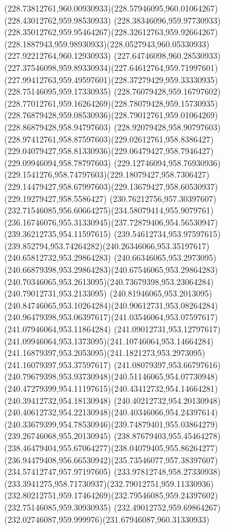 {{		\curveto(228.73812761,960.00930933)(228.57946095,960.01064267)(228.43012762,959.98530933)
		\curveto(228.38346096,959.97730933)(228.35012762,959.95464267)(228.32612763,959.92664267)
		\curveto(228.1887943,959.98930933)(228.0527943,960.05330933)(227.92212764,960.12930933)
		\curveto(227.64746098,960.28530933)(227.37546098,959.89330934)(227.64612764,959.71997601)
		\curveto(227.99412763,959.49597601)(228.37279429,959.33330935)(228.75146095,959.17330935)
		\curveto(228.76079428,959.16797602)(228.77012761,959.16264269)(228.78079428,959.15730935)
		\curveto(228.76879428,959.08530936)(228.79012761,959.01064269)(228.86879428,958.94797603)
		\curveto(228.92079428,958.90797603)(228.97412761,958.87597603)(229.02612761,958.8386427)
		\curveto(229.04079427,958.81330936)(229.06479427,958.7946427)(229.09946094,958.78797603)
		\curveto(229.12746094,958.76930936)(229.1541276,958.74797603)(229.18079427,958.7306427)
		\curveto(229.14479427,958.67997603)(229.13679427,958.60530937)(229.19279427,958.5586427)
		\curveto(230.76212756,957.30397607)(232.71546085,956.60664275)(234.58079414,955.9079761)
		\curveto(236.16746076,955.31330945)(237.72879406,954.56530947)(239.36212735,954.11597615)
		\lineto(239.54612734,953.97597615)
		\curveto(239.852794,953.74264282)(240.26346066,953.35197617)(240.65812732,953.29864283)
		\curveto(240.66346065,953.2973095)(240.66879398,953.29864283)(240.67546065,953.29864283)
		\curveto(240.70346065,953.2613095)(240.73679398,953.23064284)(240.79012731,953.2133095)
		\curveto(240.81946065,953.2013095)(240.84746065,953.10264284)(240.90612731,953.08264284)
		\curveto(240.96479398,953.06397617)(241.03546064,953.07597617)(241.07946064,953.11864284)
		\curveto(241.09012731,953.12797617)(241.09946064,953.1373095)(241.10746064,953.14664284)
		\curveto(241.16879397,953.2053095)(241.1821273,953.2973095)(241.16079397,953.37597617)
		\curveto(241.08079397,953.66797616)(240.79679398,953.93730948)(240.51146065,954.07730948)
		\curveto(240.47279399,954.11197615)(240.43412732,954.14664281)(240.39412732,954.18130948)
		\curveto(240.40212732,954.20130948)(240.40612732,954.22130948)(240.40346066,954.24397614)
		\curveto(240.33679399,954.78530946)(239.74879401,955.03864279)(239.26746068,955.20130945)
		\curveto(238.87679403,955.45464278)(238.46479404,955.67064277)(238.04079405,955.86264277)
		\curveto(236.94479408,956.66530942)(235.73546077,957.38397607)(234.57412747,957.97197605)
		\curveto(233.97812748,958.27330938)(233.3941275,958.71730937)(232.79012751,959.11330936)
		\curveto(232.80212751,959.17464269)(232.79546085,959.24397602)(232.75146085,959.30930935)
		\curveto(232.49012752,959.69864267)(232.02746087,959.999976)(231.67946087,960.31330933)
}}
